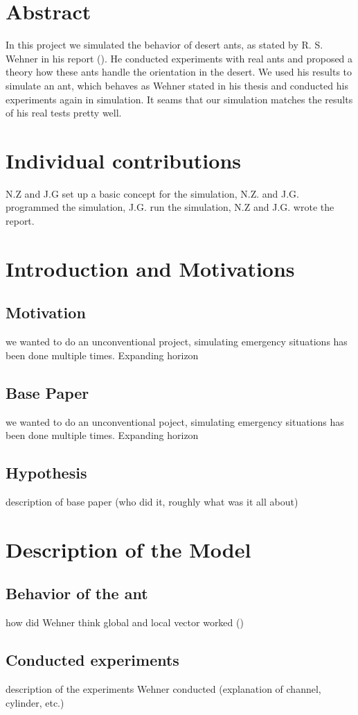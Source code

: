 \documentclass[11pt]{article}
\begin{document}
\section{Abstract} %
	In this project we simulated the behavior of desert ants, as stated by R. S. Wehner in his report (\cite{wehner}). He conducted experiments with real ants and proposed a theory how these ants handle the orientation in the desert. We used his results to simulate an ant, which behaves as Wehner stated in his thesis and conducted his experiments again in simulation. It seams that our simulation matches the results of his real tests pretty well.
\newpage

\section{Individual contributions} %
	N.Z and J.G set up a basic concept for the simulation, N.Z. and J.G. programmed the simulation, J.G. run the simulation, N.Z and J.G. wrote the report.
\section{Introduction and Motivations} %
	\subsection{Motivation}
		we wanted to do an unconventional project, simulating emergency situations has been done multiple times. Expanding horizon
	\subsection{Base Paper}
		we wanted to do an unconventional poject, simulating emergency situations has been done multiple times. Expanding horizon
	\subsection{Hypothesis}
		description of base paper (who did it, roughly what was it all about)
\section{Description of the Model} %
	\subsection{Behavior of the ant}
		how did Wehner think global and local vector worked (\cite{wehner})
	\subsection{Conducted experiments}
		description of the experiments Wehner conducted (explanation of channel, cylinder, etc.)
\end{document}
